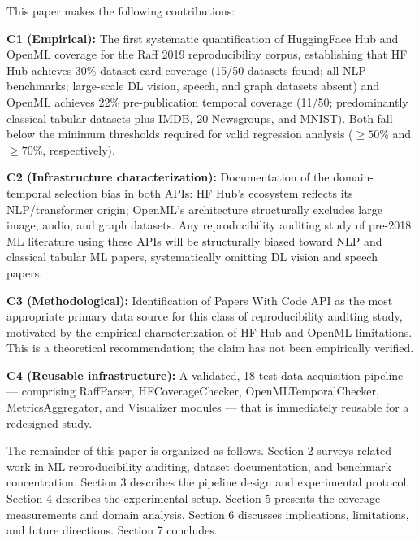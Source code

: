 This paper makes the following contributions:

\textbf{C1 (Empirical):} The first systematic quantification of HuggingFace Hub and OpenML coverage for the Raff 2019 reproducibility corpus, establishing that HF Hub achieves 30\% dataset card coverage (15/50 datasets found; all NLP benchmarks; large-scale DL vision, speech, and graph datasets absent) and OpenML achieves 22\% pre-publication temporal coverage (11/50; predominantly classical tabular datasets plus IMDB, 20 Newsgroups, and MNIST). Both fall below the minimum thresholds required for valid regression analysis ($\geq 50$\% and $\geq 70$\%, respectively).

\textbf{C2 (Infrastructure characterization):} Documentation of the domain-temporal selection bias in both APIs: HF Hub's ecosystem reflects its NLP/transformer origin; OpenML's architecture structurally excludes large image, audio, and graph datasets. Any reproducibility auditing study of pre-2018 ML literature using these APIs will be structurally biased toward NLP and classical tabular ML papers, systematically omitting DL vision and speech papers.

\textbf{C3 (Methodological):} Identification of Papers With Code API as the most appropriate primary data source for this class of reproducibility auditing study, motivated by the empirical characterization of HF Hub and OpenML limitations. This is a theoretical recommendation; the claim has not been empirically verified.

\textbf{C4 (Reusable infrastructure):} A validated, 18-test data acquisition pipeline --- comprising RaffParser, HFCoverageChecker, OpenMLTemporalChecker, MetricsAggregator, and Visualizer modules --- that is immediately reusable for a redesigned study.

The remainder of this paper is organized as follows. Section 2 surveys related work in ML reproducibility auditing, dataset documentation, and benchmark concentration. Section 3 describes the pipeline design and experimental protocol. Section 4 describes the experimental setup. Section 5 presents the coverage measurements and domain analysis. Section 6 discusses implications, limitations, and future directions. Section 7 concludes.


